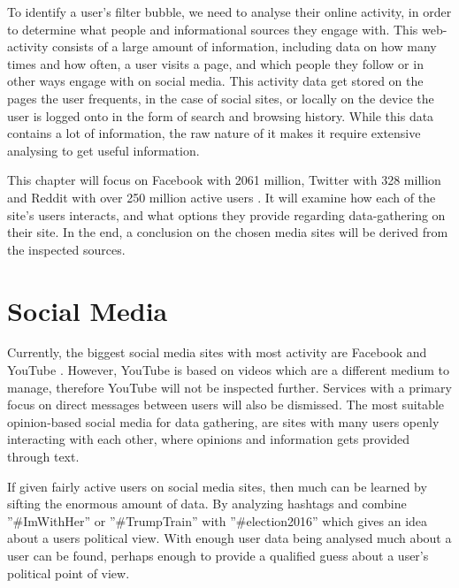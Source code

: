 
To identify a user's filter bubble, we need to analyse their online activity, in
order to determine what people and informational sources they engage with. This
web-activity consists of a large amount of information, including data on how
many times and how often, a user visits a page, and which people they follow or
in other ways engage with on social media. This activity data get stored on the
pages the user frequents, in the case of social sites, or locally on the device
the user is logged onto in the form of search and browsing history. While this
data contains a lot of information, the raw nature of it makes it require
extensive analysing to get useful information.\nl


This chapter will focus on Facebook with 2061 million, Twitter with 328 million
and Reddit with over 250 million active users \citep{SocialMediaStats,
AdvertiseOnReddit}.
It will examine how each of the site's users interacts, and what options they
provide regarding data-gathering on their site. In the end, a conclusion on the
chosen media sites will be derived from the inspected sources.

\section{Social Media}
Currently, the biggest social media sites with most activity are Facebook and
YouTube \citep{SocialMediaStats}. However, YouTube is based on videos which are
a different medium to manage, therefore YouTube will not be inspected further.
Services with a primary focus on direct messages between users will also be
dismissed. The most suitable opinion-based social media for data gathering, are
sites with many users openly interacting with each other, where opinions and
information gets provided through text.\nl

If given fairly active users on social media sites, then much can be learned by
sifting the enormous amount of data. By analyzing hashtags and combine
”\#ImWithHer” or ”\#TrumpTrain” with ”\#election2016” which gives an idea about
a users political view. With enough user data being analysed much about a user
can be found, perhaps enough to provide a qualified guess about a user's
political point of view.\nl



